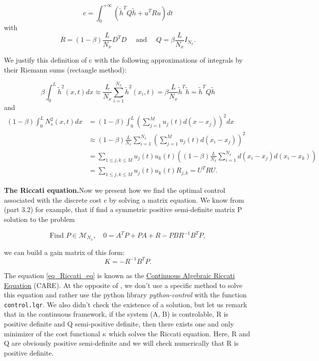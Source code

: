 \documentclass[12pt]{article}
\begin{document}
\begin{equation}\label{eq_LQR_discrete_cost}
\boxed{
    c = \int_0^{+\infty}(\tilde{h}^TQ\tilde{h}+u^TRu)dt}
\end{equation}
with 
\begin{equation}\label{eq_LQR_discrete_cost_matrices}
   R=(1-\beta)\frac{L}{N_x}D^TD\quad \text{ and } \quad  Q=\beta \frac{L}{N_x}I_{N_x}.
\end{equation}

We justify this definition of c with the following approximations of integrals by their Riemann sums (rectangle method):

$$\beta\int_0^L\tilde{h}^2(x,t)dx \boxed{\approx} \frac{L}{N_x}\sum_{i=1}^{N_x}\tilde{h}^2(x_i,t) = \beta\frac{L}{N_x}\tilde{h}^T\tilde{h}=\tilde{h}^TQ\tilde{h}$$
and 
\begin{align*} (1-\beta)\int_0^L N_s^2(x, t)dx &= (1-\beta)\int_0^L(\sum_{j=1}^{M}u_j(t)d(x-x_j))^2dx \\ &\boxed{\approx} (1-\beta)\frac{L}{N_x}\sum_{i=1}^{N_x}(\sum_{j=1}^{M}u_j(t)d(x_i-x_j))^2 \\&= \sum_{1\leq j, k\leq M}u_j(t)u_k(t)((1-\beta)\frac{L}{N_x}\sum_{i=1}^{N_x}d(x_i-x_j)d(x_i-x_k)) \\ &= \sum_{1\leq j, k\leq M}u_j(t)u_k(t) R_{j,k} = U^TRU.\end{align*}



\textbf{The Riccati equation.}Now we present how we find the optimal control associated with the discrete cost c by solving a matrix equation. We know from \cite{A_Thompson_FLF_blowing_suction} (part 3.2) for example, that if find a symmetric positive semi-definite matrix P solution to the problem

\begin{equation}\label{eq_Riccati_eq}
    \text{Find } P\in \mathcal{M}_{N_x}, \quad 0=A^TP+PA+R-PBR^{-1}B^TP, 
\end{equation}

 we can build a gain matrix of this form:
 \begin{equation}
    K = -R^{-1}B^TP.
 \end{equation}
 
 The equation \eqref{eq_Riccati_eq} is known as the \underline{Continuous Algebraic Riccati Equation} (CARE). At the opposite of \cite{holroyd2023linearquadraticregulationcontrol}, we don't use a specific method to solve this equation and rather use the python library \textit{python-control} with the function \texttt{control.lqr}. We also didn't check the existence of a solution, but let us remark that in the continuous framework, if the system (A, B) is controlable,  R is positive definite and Q semi-positive definite, then there exists one and only minimizer of the cost functional $\kappa$ which solves the Riccati equation. Here, R and Q are obviously positive semi-definite and we will check numerically that R is positive definite. 
\end{document}
